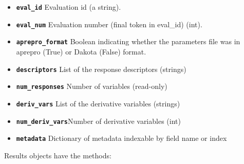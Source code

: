 \begin{itemize}

  \item{} \label{index:dakota.interfacing.Results.eval_id}\textbf{\texttt{eval\_id}} Evaluation id (a string).

  \item{} \label{index:dakota.interfacing.Results.eval_num}\textbf{\texttt{eval\_num}} Evaluation number (final token in eval\_id) (int).

  \item{} \label{index:dakota.interfacing.Results.aprepro_format}\textbf{\texttt{aprepro\_format}} Boolean indicating whether the parameters file was in
aprepro (True) or Dakota (False) format.

  \item{} \label{index:dakota.interfacing.Results.descriptors}\textbf{\texttt{descriptors}} List of the response descriptors (strings)

  \item{}  \label{index:dakota.interfacing.Results.num_responses}\textbf{\texttt{num\_responses}} Number of variables (read-only)

  \item{} \label{index:dakota.interfacing.Results.deriv_vars}\textbf{\texttt{deriv\_vars}} List of the derivative variables (strings)

  \item{}\label{index:dakota.interfacing.Results.num_deriv_vars}\textbf{\texttt{num\_deriv\_vars}}Number of derivative variables (int)

  \item{} \label{index:dakota.interfacing.Results.metadata}\textbf{\texttt{metadata}} Dictionary of metadata indexable by field name or index



\end{itemize}

Results objects have the methods:

